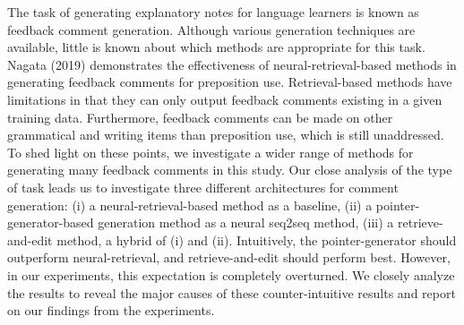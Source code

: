The task of generating explanatory notes for language learners is known as feedback comment generation. Although various generation techniques are available, little is known about which methods are appropriate for this task.  Nagata (2019) demonstrates the effectiveness of neural-retrieval-based methods in generating feedback comments for preposition use.  Retrieval-based methods have limitations in that they can only output feedback comments existing in a given training data. Furthermore, feedback comments can be made on other grammatical and writing items than preposition use, which is still unaddressed. To shed light on these points, we investigate a wider range of methods for generating many feedback comments in this study. Our close analysis of the type of task leads us to investigate three different architectures for comment generation: (i) a neural-retrieval-based method as a baseline, (ii) a pointer-generator-based generation method as a neural seq2seq method, (iii) a retrieve-and-edit method, a hybrid of (i) and (ii).  Intuitively, the pointer-generator should outperform neural-retrieval, and retrieve-and-edit should perform best. However, in our experiments, this expectation is completely overturned. We closely analyze the results to reveal the major causes of these counter-intuitive results and report on our findings from the experiments.
